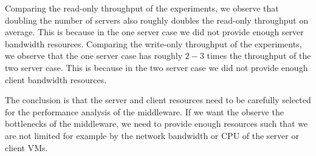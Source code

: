 Comparing the read-only throughput of the experiments, we observe that doubling the number of servers also roughly doubles the read-only throughput on average. This is because in the one server case we did not provide enough server bandwidth resources. 
Comparing the write-only throughput of the experiments, we observe that the one server case has roughly $2-3$ times the throughput of the two server case. This is because in the two server case we did not provide enough client bandwidth resources. 

The conclusion is that the server and client resources need to be carefully selected for the performance analysis of the middleware. If we want the observe the bottlenecks of the middleware, we need to provide enough resources such that we are not limited for example by the network bandwidth or CPU of the server or client VMs. 